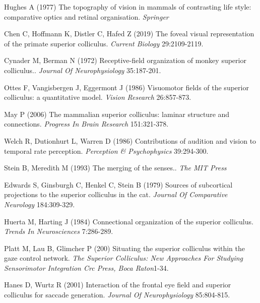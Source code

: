 \documentclass{ar-1col}
\begin{document}
{\begin{thebibliography}{00}
Hughes A (1977) 
The topography of vision in mammals of contrasting life style: comparative optics and retinal organisation.
\textit{ Springer}

Chen C, Hoffmann K, Distler C, Hafed Z (2019) 
The foveal visual representation of the primate superior colliculus.
\textit{ Current Biology} 29:2109-2119.

Cynader M, Berman N (1972) 
Receptive-field organization of monkey superior colliculus..
\textit{ Journal Of Neurophysiology} 35:187-201.

Ottes F, Vangisbergen J, Eggermont J (1986) 
Visuomotor fields of the superior colliculus: a quantitative model.
\textit{ Vision Research} 26:857-873.

May P (2006) 
The mammalian superior colliculus: laminar structure and connections.
\textit{ Progress In Brain Research} 151:321-378.

Welch R, Dutionhurt L, Warren D (1986) 
Contributions of audition and vision to temporal rate perception.
\textit{ Perception \& Psychophysics} 39:294-300.

Stein B, Meredith M (1993) 
The merging of the senses..
\textit{ The MIT Press}

Edwards S, Ginsburgh C, Henkel C, Stein B (1979) 
Sources of subcortical projections to the superior colliculus in the cat.
\textit{ Journal Of Comparative Neurology} 184:309-329.

Huerta M, Harting J (1984) 
Connectional organization of the superior colliculus.
\textit{ Trends In Neurosciences} 7:286-289.

Platt M, Lau B, Glimcher P (200) 
Situating the superior colliculus within the gaze control network.
\textit{ The Superior Colliculus: New Approaches For Studying Sensorimotor Integration Crc Press, Boca Raton}1-34.

Hanes D, Wurtz R (2001) 
Interaction of the frontal eye field and superior colliculus for saccade generation.
\textit{ Journal Of Neurophysiology} 85:804-815.


\end{thebibliography}}
\end{document}
